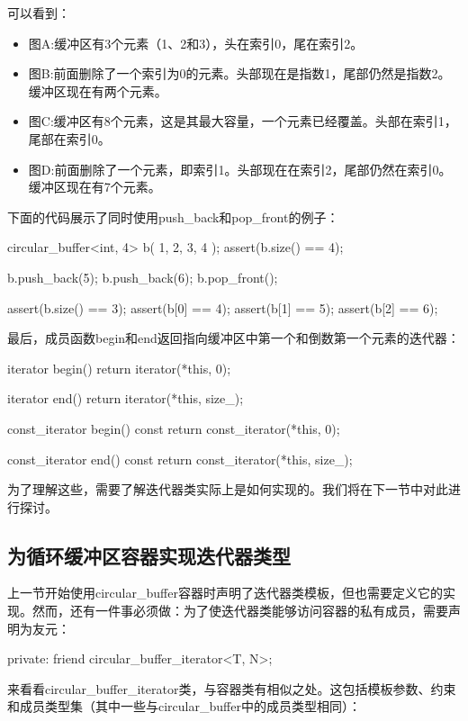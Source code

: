 可以看到：

\begin{itemize}
  \item 图A:缓冲区有3个元素（1、2和3），头在索引0，尾在索引2。
  \item 图B:前面删除了一个索引为0的元素。头部现在是指数1，尾部仍然是指数2。缓冲区现在有两个元素。
  \item 图C:缓冲区有8个元素，这是其最大容量，一个元素已经覆盖。头部在索引1，尾部在索引0。
  \item 图D:前面删除了一个元素，即索引1。头部现在在索引2，尾部仍然在索引0。缓冲区现在有7个元素。
\end{itemize}

下面的代码展示了同时使用push\_back和pop\_front的例子：

\begin{cpp}
circular_buffer<int, 4> b({ 1, 2, 3, 4 });
assert(b.size() == 4);

b.push_back(5);
b.push_back(6);
b.pop_front();

assert(b.size() == 3);
assert(b[0] == 4);
assert(b[1] == 5);
assert(b[2] == 6);
\end{cpp}

最后，成员函数begin和end返回指向缓冲区中第一个和倒数第一个元素的迭代器：

\begin{cpp}
iterator begin()
{
	return iterator(*this, 0);
}

iterator end()
{
	return iterator(*this, size_);
}

const_iterator begin() const
{
	return const_iterator(*this, 0);
}

const_iterator end() const
{
	return const_iterator(*this, size_);
}
\end{cpp}

为了理解这些，需要了解迭代器类实际上是如何实现的。我们将在下一节中对此进行探讨。

\subsection{为循环缓冲区容器实现迭代器类型}

上一节开始使用circular\_buffer容器时声明了迭代器类模板，但也需要定义它的实现。然而，还有一件事必须做：为了使迭代器类能够访问容器的私有成员，需要声明为友元：

\begin{cpp}
private:
	friend circular_buffer_iterator<T, N>;
\end{cpp}

来看看circular\_buffer\_iterator类，与容器类有相似之处。这包括模板参数、约束和成员类型集（其中一些与circular\_buffer中的成员类型相同）：

